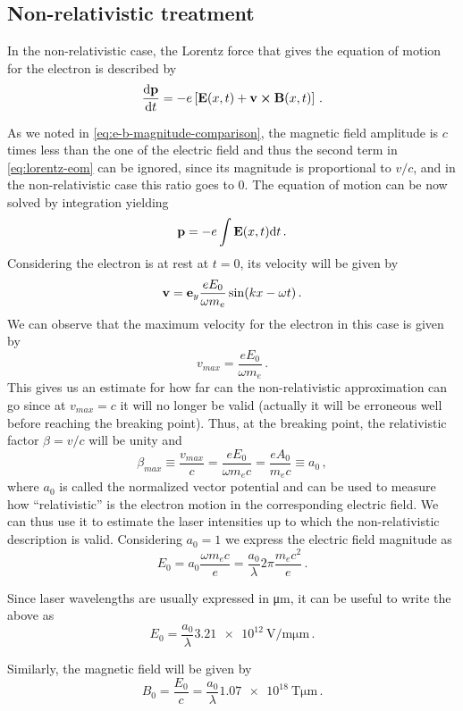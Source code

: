 \documentclass[12pt, class=report, crop=false]{standalone}
\begin{document}
\subsection{Non-relativistic treatment}

In the non-relativistic case, the Lorentz force that gives the equation of motion for the electron is described by
\begin{equation}
  \label{eq:lorentz-eom}
  \dv{\vb{p}}{t} = -e \left[ \vb{E}(x, t) + \vb{v} \cp \vb{B}(x, t) \right]\,.
\end{equation}

As we noted in \cref{eq:e-b-magnitude-comparison}, the magnetic field amplitude is \(c\) times less than the one
of the electric field and thus the second term in \cref{eq:lorentz-eom} can be ignored, since its magnitude
is proportional to \(v/c\), and in the non-relativistic case
this ratio goes to 0. The equation of motion can be now solved by integration yielding
\[
\vb{p} = -e \int \vb{E}(x,t) \dd t\,.
\]
Considering the electron is at rest at \(t=0\), its velocity
will be given by
\[
\vb{v} = \vb{e}_y \frac{e E_0}{\omega m_e} \sin(kx - \omega t)\,.
\]
We can observe that the maximum velocity for the electron in this case is given by
\[
v_{max} = \frac{e E_0}{\omega m_e}\,. %
\]
This gives us an estimate for how far can the non-relativistic approximation can go
since at \(v_{max}=c\) it will no longer be valid  %
(actually it will be erroneous well before reaching the breaking point). Thus, at the breaking point, the relativistic factor \(\beta = v/c\) will be unity and
\[
\beta_{max} \equiv \frac{v_{max}}{c} = \frac{e E_0}{\omega m_e c} = \frac{e A_0}{m_e c} \equiv a_0\,,  %
\]
where \(a_0\) is called the normalized vector potential and
can be used to measure how ``relativistic'' is the electron motion in the corresponding electric field.
We can thus use it to estimate the laser intensities up to which the non-relativistic description is valid.
Considering \(a_0=1\) we express the electric field magnitude as
\[
E_0 = a_0 \frac{\omega m_e c}{e} = \frac{a_0}{\lambda} 2\pi \frac{m_e c^2}{e}\,.
\]

Since laser wavelengths are usually expressed in \si{\micro\metre}, it can be useful to write the above as
\[
E_0 = \frac{a_0}{\lambda} \SI{3.21e12}{\volt\per\metre\micro\metre}\,.
\]

Similarly, the magnetic field will be given by
\[
B_0 = \frac{E_0}{c} = \frac{a_0}{\lambda} \SI{1.07e18}{\tesla\micro\metre}\,.
\]
\end{document}
